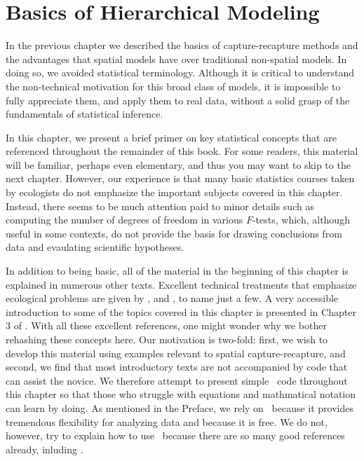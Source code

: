 \chapter{
Basics of Hierarchical Modeling
}
\label{chapt.modeling}


\vspace{.3in}

In the previous chapter we described the basics of capture-recapture
methods and the advantages that spatial models have over
traditional non-spatial models. In doing so, we avoided statistical
terminology. Although it is critical to
understand the non-technical motivation for this broad class of
models, it is impossible to fully appreciate them, and apply them to
real data, without a solid grasp of the fundamentals of statistical
inference.

In this chapter, we present a brief primer on key
statistical concepts that are referenced throughout the remainder of
this book. For some readers, this material will be familiar,
perhaps even elementary, and thus you may want to skip to the next
chapter. However, our experience is that many basic statistics courses
taken by ecologists do not emphasize the important subjects covered in
this chapter. Instead, there seems to be much attention paid to
minor details such as computing the number of degrees of freedom in
various $F$-tests, which, although useful in some contexts, do not
provide the basis for drawing conclusions from data and evaulating
scientific hypotheses. %

In addition to being basic, all of the material in the
beginning of this chapter is explained in numerous other
texts. %
Excellent technical treatments that emphasize ecological
problems are given by
\citet{williams_etal:2002}, \citet{royle_dorazio:2008} and
\citet{link_barker:2010}, to name just a few. A very accessible introduction to some of the
topics covered in this chapter is presented in Chapter 3 of
\citet{mackenzie_etal:2006}. With all these excellent references, one
might wonder why we bother rehashing these concepts here. Our motivation is
two-fold: first, we wish to develop this material using examples
relevant to spatial capture-recapture, and second, we find that most
introductory texts are not accompanied by code that can
assist the novice. We therefore attempt to present simple \R~code
throughout this chapter so that those who struggle with equations and
mathmatical notation can learn by doing. As mentioned in the Preface,
we rely on \R~because it provides tremendous flexibility for analyzing
data and because it is free. We do not, however, try to explain how to
use \R~because there are so many good references already, inluding
\citet{venables_ripley:2002,bolker:2008,venables_etal:2012}.

